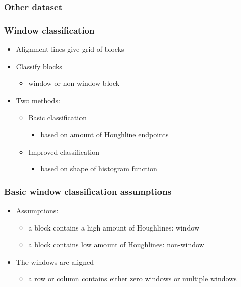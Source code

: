 \documentclass{beamer}
\begin{document}
\frame
{
}

\frame
{
	\frametitle{Other dataset}
}

\frame
{
}

\frame
{
}


\frame
{
}


\frame
{
	\frametitle{Window classification}
	\begin{itemize}
	\item <+-| alert@+> Alignment lines give grid of blocks
	\item <+-| alert@+> Classify blocks 
		\begin{itemize}
		\item <+-| alert@+> window or non-window block
		\end{itemize}
	\item <+-| alert@+> Two methods:
		\begin{itemize}
		\item <+-| alert@+> Basic classification 
			\begin{itemize}
			\item <+-| alert@+> based on amount of Houghline endpoints
			\end{itemize}
		\item <+-| alert@+> Improved classification 
			\begin{itemize}
			\item <+-| alert@+> based on shape of histogram function
			\end{itemize}
		\end{itemize}
	\end{itemize}
}

\frame
{
	\frametitle{Basic window classification assumptions}
	\begin{itemize}
	\item <+-| alert@+> Assumptions:
		\begin{itemize}
		\item <+-| alert@+> a block contains a high amount of Houghlines: window
		\item <+-| alert@+> a block contains low amount of Houghlines: non-window
		\end{itemize}
	\item <+-| alert@+> The windows are aligned 
		\begin{itemize}
		\item <+-| alert@+> a row or column contains either zero windows or multiple windows 
		\end{itemize}
	\end{itemize}
}
\end{document}

